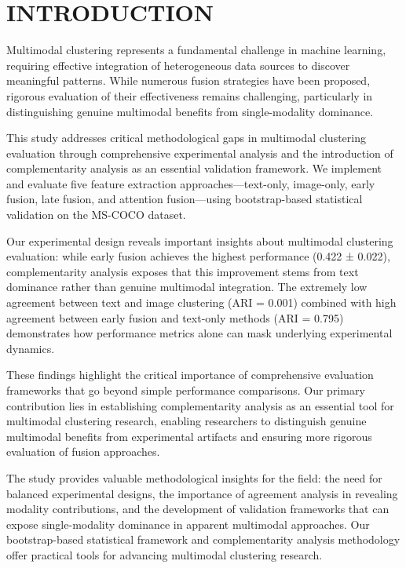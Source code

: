 \documentclass[sigconf]{acmart}
\begin{document}
\maketitle

\section{INTRODUCTION}

Multimodal clustering represents a fundamental challenge in machine learning, requiring effective integration of heterogeneous data sources to discover meaningful patterns. While numerous fusion strategies have been proposed, rigorous evaluation of their effectiveness remains challenging, particularly in distinguishing genuine multimodal benefits from single-modality dominance.

This study addresses critical methodological gaps in multimodal clustering evaluation through comprehensive experimental analysis and the introduction of complementarity analysis as an essential validation framework. We implement and evaluate five feature extraction approaches—text-only, image-only, early fusion, late fusion, and attention fusion—using bootstrap-based statistical validation on the MS-COCO dataset.

Our experimental design reveals important insights about multimodal clustering evaluation: while early fusion achieves the highest performance (0.422 ± 0.022), complementarity analysis exposes that this improvement stems from text dominance rather than genuine multimodal integration. The extremely low agreement between text and image clustering (ARI = 0.001) combined with high agreement between early fusion and text-only methods (ARI = 0.795) demonstrates how performance metrics alone can mask underlying experimental dynamics.

These findings highlight the critical importance of comprehensive evaluation frameworks that go beyond simple performance comparisons. Our primary contribution lies in establishing complementarity analysis as an essential tool for multimodal clustering research, enabling researchers to distinguish genuine multimodal benefits from experimental artifacts and ensuring more rigorous evaluation of fusion approaches.

The study provides valuable methodological insights for the field: the need for balanced experimental designs, the importance of agreement analysis in revealing modality contributions, and the development of validation frameworks that can expose single-modality dominance in apparent multimodal approaches. Our bootstrap-based statistical framework and complementarity analysis methodology offer practical tools for advancing multimodal clustering research.
\end{document}

